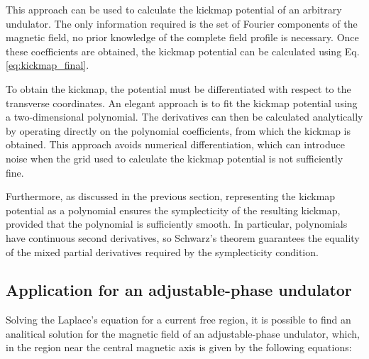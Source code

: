 \documentclass[a4paper,12pt]{article}
\begin{document}
This approach can be used to calculate the kickmap potential of an arbitrary undulator.
 The only information required is the set of Fourier components of the magnetic field, no prior knowledge
  of the complete field profile is necessary. Once these coefficients are obtained, the kickmap
   potential can be calculated using Eq. \eqref{eq:kickmap_final}.

To obtain the kickmap, the potential must be differentiated with respect to the transverse coordinates.
 An elegant approach is to fit the kickmap potential using a two-dimensional polynomial. The derivatives
  can then be calculated analytically by operating directly on the polynomial coefficients, from which
   the kickmap is obtained. This approach avoids numerical differentiation, which can introduce noise
    when the grid used to calculate the kickmap potential is not sufficiently fine. \cite{lnlsfac_idanalysis}

Furthermore, as discussed in the previous section, representing the kickmap potential
 as a polynomial ensures the symplecticity of the resulting kickmap, provided that the polynomial
  is sufficiently smooth. In particular, polynomials have continuous second derivatives, so Schwarz's
   theorem guarantees the equality of the mixed partial derivatives required by the symplecticity condition.

\subsection{Application for an adjustable-phase undulator}
Solving the Laplace's equation for a current free region, it is possible to find an analitical solution for the 
magnetic field of an adjustable-phase undulator, which, in the region near the central magnetic axis is given
 by the following equations:
\end{document}
